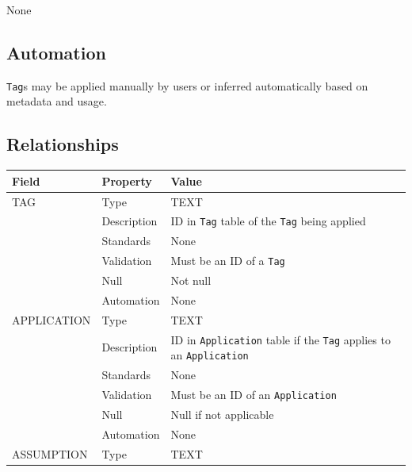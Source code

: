 \documentclass[
]{article}
\newcounter{none}
\begin{document}
None

\subsection{Automation}\label{automation-36}

\texttt{Tag}s may be applied manually by users or inferred automatically
based on metadata and usage.

\subsection{Relationships}\label{relationships-29}

{\def\LTcaptype{none} 
\begin{longtable}[]{@{}
  >{\raggedright\arraybackslash}p{}
  >{\raggedright\arraybackslash}p{}
  >{\raggedright\arraybackslash}p{}@{}}
\toprule\noalign{}
\begin{minipage}[b]{\linewidth}\raggedright
Field
\end{minipage} & \begin{minipage}[b]{\linewidth}\raggedright
Property
\end{minipage} & \begin{minipage}[b]{\linewidth}\raggedright
Value
\end{minipage} \\
\midrule\noalign{}
\endhead
\bottomrule\noalign{}
\endlastfoot
TAG & Type & TEXT \\
& Description & ID in \texttt{Tag} table of the \texttt{Tag} being
applied \\
& Standards & None \\
& Validation & Must be an ID of a \texttt{Tag} \\
& Null & Not null \\
& Automation & None \\
APPLICATION & Type & TEXT \\
& Description & ID in \texttt{Application} table if the \texttt{Tag}
applies to an \texttt{Application} \\
& Standards & None \\
& Validation & Must be an ID of an \texttt{Application} \\
& Null & Null if not applicable \\
& Automation & None \\
ASSUMPTION & Type & TEXT \\

\end{longtable}}
\end{document}
